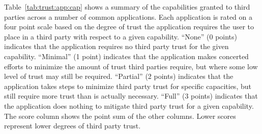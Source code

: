 Table~\ref{tab:trust:app:cap} shows a summary of the capabilities
granted to third parties across a number of common applications. Each
application is rated on a four point scale based on the degree of
trust the application requires the user to place in a third party with
respect to a given capability. ``None'' (0 points) indicates that the
application requires no third party trust for the given
capability. ``Minimal'' (1 point) indicates that the application makes
concerted efforts to minimize the amount of trust third parties
require, but where some low level of trust may still be
required. ``Partial'' (2 points) indicates that the application takes
steps to minimize third party trust for specific capacities, but still
require more trust than is actually necessary. ``Full'' (3 points)
indicates that the application does nothing to mitigate third party
trust for a given capability. The score column shows the point sum of
the other columns. Lower scores represent lower degrees of third party
trust.


